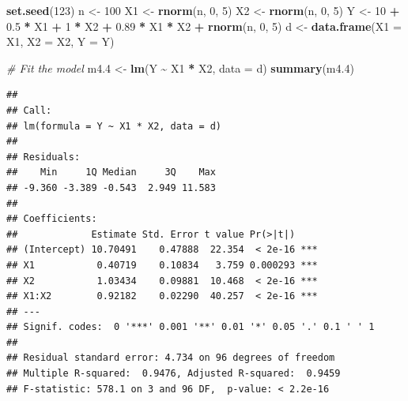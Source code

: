 \documentclass[
]{book}
\newenvironment{Shaded}{\begin{snugshade}}{\end{snugshade}}
\newcommand{\AttributeTok}[1]{\textcolor[rgb]{0.13,0.29,0.53}{#1}}
\newcommand{\CommentTok}[1]{\textcolor[rgb]{0.56,0.35,0.01}{\textit{#1}}}
\newcommand{\DecValTok}[1]{\textcolor[rgb]{0.00,0.00,0.81}{#1}}
\newcommand{\FloatTok}[1]{\textcolor[rgb]{0.00,0.00,0.81}{#1}}
\newcommand{\FunctionTok}[1]{\textcolor[rgb]{0.13,0.29,0.53}{\textbf{#1}}}
\newcommand{\NormalTok}[1]{#1}
\newcommand{\OtherTok}[1]{\textcolor[rgb]{0.56,0.35,0.01}{#1}}
\newcommand{\SpecialCharTok}[1]{\textcolor[rgb]{0.81,0.36,0.00}{\textbf{#1}}}
\begin{document}
\begin{Shaded}
\begin{Highlighting}[]
\FunctionTok{set.seed}\NormalTok{(}\DecValTok{123}\NormalTok{)}
\NormalTok{n }\OtherTok{\textless{}{-}} \DecValTok{100}
\NormalTok{X1 }\OtherTok{\textless{}{-}} \FunctionTok{rnorm}\NormalTok{(n, }\DecValTok{0}\NormalTok{, }\DecValTok{5}\NormalTok{)}
\NormalTok{X2 }\OtherTok{\textless{}{-}} \FunctionTok{rnorm}\NormalTok{(n, }\DecValTok{0}\NormalTok{, }\DecValTok{5}\NormalTok{)}
\NormalTok{Y }\OtherTok{\textless{}{-}} \DecValTok{10} \SpecialCharTok{+} \FloatTok{0.5} \SpecialCharTok{*}\NormalTok{ X1 }\SpecialCharTok{+} \DecValTok{1} \SpecialCharTok{*}\NormalTok{ X2 }\SpecialCharTok{+} \FloatTok{0.89} \SpecialCharTok{*}\NormalTok{ X1 }\SpecialCharTok{*}\NormalTok{ X2 }\SpecialCharTok{+} \FunctionTok{rnorm}\NormalTok{(n, }\DecValTok{0}\NormalTok{, }\DecValTok{5}\NormalTok{)}
\NormalTok{d }\OtherTok{\textless{}{-}} \FunctionTok{data.frame}\NormalTok{(}\AttributeTok{X1 =}\NormalTok{ X1, }\AttributeTok{X2 =}\NormalTok{ X2, }\AttributeTok{Y =}\NormalTok{ Y)}

\CommentTok{\# Fit the model}
\NormalTok{m4}\FloatTok{.4} \OtherTok{\textless{}{-}} \FunctionTok{lm}\NormalTok{(Y }\SpecialCharTok{\textasciitilde{}}\NormalTok{ X1 }\SpecialCharTok{*}\NormalTok{ X2, }\AttributeTok{data =}\NormalTok{ d)}
\FunctionTok{summary}\NormalTok{(m4}\FloatTok{.4}\NormalTok{)}
\end{Highlighting}
\end{Shaded}

\begin{verbatim}
## 
## Call:
## lm(formula = Y ~ X1 * X2, data = d)
## 
## Residuals:
##    Min     1Q Median     3Q    Max 
## -9.360 -3.389 -0.543  2.949 11.583 
## 
## Coefficients:
##             Estimate Std. Error t value Pr(>|t|)    
## (Intercept) 10.70491    0.47888  22.354  < 2e-16 ***
## X1           0.40719    0.10834   3.759 0.000293 ***
## X2           1.03434    0.09881  10.468  < 2e-16 ***
## X1:X2        0.92182    0.02290  40.257  < 2e-16 ***
## ---
## Signif. codes:  0 '***' 0.001 '**' 0.01 '*' 0.05 '.' 0.1 ' ' 1
## 
## Residual standard error: 4.734 on 96 degrees of freedom
## Multiple R-squared:  0.9476, Adjusted R-squared:  0.9459 
## F-statistic: 578.1 on 3 and 96 DF,  p-value: < 2.2e-16
\end{verbatim}
\end{document}
